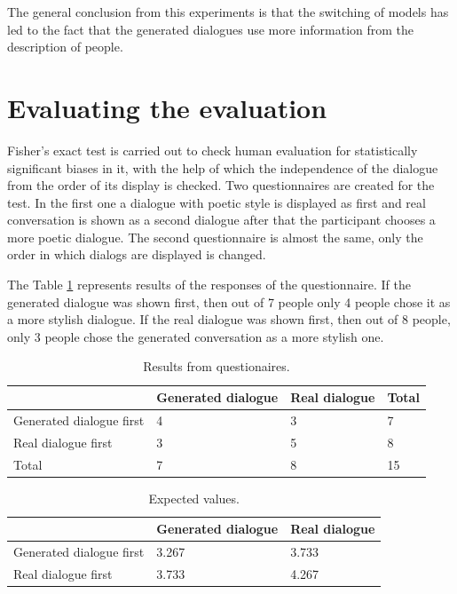The general conclusion from this experiments is that the switching of models has led to the fact that the generated dialogues use more information from the description of people.

\section{Evaluating the evaluation}
Fisher's exact test is carried out to check human evaluation for statistically significant biases in it, with the help of which the independence of the dialogue from the order of its display is checked. Two questionnaires are created for the test. In the first one a dialogue with poetic style is displayed as first and real conversation is shown as a second dialogue after that the participant chooses a more poetic dialogue. The second questionnaire is almost the same, only the order in which dialogs are displayed is changed.

The Table \ref{tab:fisher} represents results of the responses of the questionnaire. If the generated dialogue was shown first, then out of 7 people only 4 people chose it as a more stylish dialogue. If the real dialogue was shown first, then out of 8 people, only 3 people chose the generated conversation as a more stylish one.

\begin{table}[ht]
\centering
 \begin{tabular}{|p{4cm}|p{4cm}|p{3cm}|p{2cm}|} 
 \hline
  & Generated dialogue & Real dialogue & Total\\
 \hline
  Generated dialogue first & 4 & 3 & 7 \\
 \hline
  Real dialogue first & 3 & 5 & 8 \\
 \hline
  Total & 7 & 8 & 15\\
 \hline
 \end{tabular}
 \caption{Results from questionaires.}
\label{tab:fisher}
\end{table}

\begin{table}[ht]
\centering
 \begin{tabular}{|p{4cm}|p{4cm}|p{3cm}|} 
 \hline
  & Generated dialogue & Real dialogue \\
 \hline
  Generated dialogue first & 3.267 & 3.733 \\
 \hline
  Real dialogue first & 3.733 & 4.267 \\
 \hline
 \end{tabular}
 \caption{Expected values.}
\label{tab:expected_vals}
\end{table}


